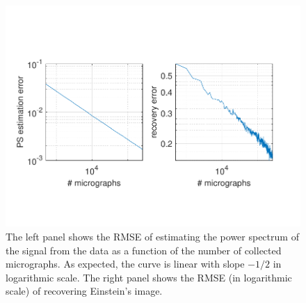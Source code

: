\documentclass[english,11pt]{article}
\newcommand{\TODO}[1]{{\color{red}{[#1]}}}
\numberwithin{equation}{section}
\theoremstyle{plain}
\theoremstyle{definition}
\theoremstyle{remark}
\theoremstyle{plain}
\theoremstyle{remark}
\theoremstyle{plain}
\theoremstyle{plain}
\begin{document}
\begin{figure}[h]
\centering
\includegraphics[scale=.7]{Einstein_progress}
\caption{\label{fig:error_per_micro} The left panel shows the RMSE of estimating the power spectrum of the signal from the data as a function of the number of  collected micrographs. As expected, the curve is linear with slope $-1/2$ in logarithmic scale. The right panel shows the RMSE  (in logarithmic scale) of recovering Einstein's image. \TODO{The program still runs so these figures will be extended to the right (more micrographs).}}	
\end{figure}

%
%
\end{document}

